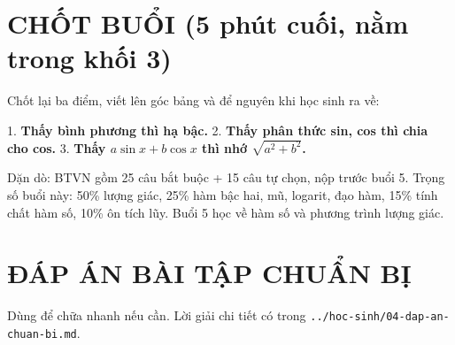 \documentclass[11pt, a4paper]{article}
\begin{document}

\section{CHỐT BUỔI (5 phút cuối, nằm trong khối 3)}

Chốt lại ba điểm, viết lên góc bảng và để nguyên khi học sinh ra về:

1. \textbf{Thấy bình phương thì hạ bậc.}
2. \textbf{Thấy phân thức sin, cos thì chia cho cos.}
3. \textbf{Thấy $a\sin x + b\cos x$ thì nhớ $\sqrt{a^2+b^2}$.}

Dặn dò: BTVN gồm 25 câu bắt buộc + 15 câu tự chọn, nộp trước buổi 5. Trọng số buổi này: 50\% lượng giác, 25\% hàm bậc hai, mũ, logarit, đạo hàm, 15\% tính chất hàm số, 10\% ôn tích lũy. Buổi 5 học về hàm số và phương trình lượng giác.

\section{ĐÁP ÁN BÀI TẬP CHUẨN BỊ}

Dùng để chữa nhanh nếu cần. Lời giải chi tiết có trong \texttt{../hoc-sinh/04-dap-an-chuan-bi.md}.

\end{document}
